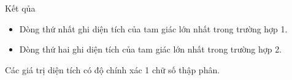 Kết qủa  
\begin{itemize}
	\item     Dòng thứ nhất ghi diện tích của tam giác lớn nhất trong trường hợp 1.   
	\item     Dòng thứ hai ghi diện tích của tam giác lớn nhất trong trường hợp 2.   
\end{itemize}

   Các giá trị diện tích có độ chính xác 1 chữ số thập phân.